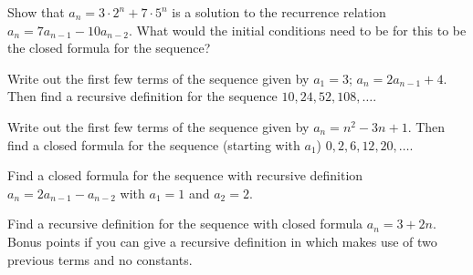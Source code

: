 \documentclass[11pt,]{book}
\theoremstyle{ptxplainnotitle}
\theoremstyle{ptxplaintitle}
\theoremstyle{ptxdefinitionnotitle}
\theoremstyle{ptxdefinitiontitle}
\theoremstyle{ptxdefinitionnotitle}
\theoremstyle{ptxdefinitiontitle}
\theoremstyle{ptxdefinitionnotitle}
\theoremstyle{ptxdefinitiontitle}
\theoremstyle{ptxdefinitiontitlenonumber}
\theoremstyle{ptxdefinitiontitlenonumber}
\numberwithin{equation}{chapter}
\begin{document}
\begin{divisionexercise}{6}\hypertarget{exercise-6}{}
\hypertarget{p-136}{}%
Show that \(a_n = 3\cdot 2^n + 7\cdot 5^n\) is a solution to the recurrence relation \(a_n = 7a_{n-1} - 10a_{n-2}\).   What would the initial conditions need to be for this to be the closed formula for the sequence?%
\end{divisionexercise}%
\begin{divisionexercise}{7}\hypertarget{exercise-7}{}
\hypertarget{p-137}{}%
Write out the first few terms of the sequence given by \(a_1 = 3\); \(a_n = 2a_{n-1} + 4\). Then find a recursive definition for the sequence \(10, 24, 52, 108, \ldots\).%
\end{divisionexercise}%
\begin{divisionexercise}{8}\hypertarget{exercise-8}{}
\hypertarget{p-138}{}%
Write out the first few terms of the sequence given by \(a_n = n^2 - 3n + 1\). Then find a closed formula for the sequence (starting with \(a_1\)) \(0, 2, 6, 12, 20, \ldots\).%
\end{divisionexercise}%
\begin{divisionexercise}{9}\hypertarget{exercise-9}{}
\hypertarget{p-139}{}%
Find a closed formula for the sequence with recursive definition \(a_n = 2a_{n-1} - a_{n-2}\) with \(a_1 = 1\) and \(a_2 = 2\).%
\end{divisionexercise}%
\begin{divisionexercise}{10}\hypertarget{exercise-10}{}
\hypertarget{p-140}{}%
Find a recursive definition for the sequence with closed formula \(a_n = 3 + 2n\). Bonus points if you can give a recursive definition in which makes use of two previous terms and no constants.%
\end{divisionexercise}%
\end{document}
